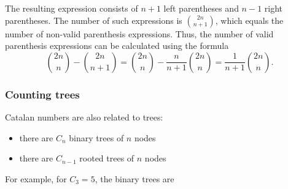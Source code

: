 The resulting expression consists of $n+1$
left parentheses and $n-1$ right parentheses.
The number of such expressions is ${2n \choose n+1}$,
which equals the number of non-valid
parenthesis expressions.
Thus, the number of valid parenthesis
expressions can be calculated using the formula
\[{2n \choose n}-{2n \choose n+1} = {2n \choose n} - \frac{n}{n+1} {2n \choose n} = \frac{1}{n+1} {2n \choose n}.\]

\subsubsection{Counting trees}

Catalan numbers are also related to trees:

\begin{itemize}
\item there are $C_n$ binary trees of $n$ nodes
\item there are $C_{n-1}$ rooted trees of $n$ nodes
\end{itemize}
\noindent
For example, for $C_3=5$, the binary trees are

